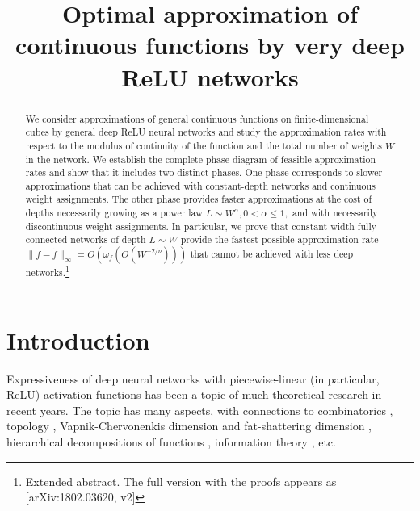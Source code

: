 \documentclass[final, 12pt]{colt2018}
\newcommand{\footremember}[2]{%
    \footnote{#2}
    \newcounter{#1}
    \setcounter{#1}{\value{footnote}}%
}
\begin{document}
\title{Optimal approximation of continuous functions by very deep ReLU networks
}
\maketitle


\begin{abstract} We consider approximations of general continuous functions on finite-dimensional cubes by general deep ReLU neural networks and study the approximation rates with respect to the modulus of continuity of the function and the total number of weights $W$ in the network. We establish the complete phase diagram of feasible approximation rates and show that it includes two distinct phases. One phase corresponds to slower approximations that can be achieved with constant-depth networks and continuous weight assignments. The other phase provides faster approximations at the cost of depths necessarily growing as a power law $L\sim W^{\alpha}, 0<\alpha\le 1,$ and with necessarily discontinuous weight assignments. In particular, we prove that constant-width fully-connected networks of depth $L\sim W$ provide the fastest possible approximation rate $\|f-\widetilde f\|_\infty = O(\omega_f(O(W^{-2/\nu})))$ that cannot be achieved with less deep networks.\footnote{Extended abstract.
The full version with the proofs appears as [arXiv:1802.03620, v2]}  
\end{abstract}

\section{Introduction}
Expressiveness of deep neural networks with piecewise-linear (in particular, ReLU) activation functions has been a topic of much theoretical research in recent years. The topic has many aspects, with connections to combinatorics \citep{montufar2014number,telgarsky2016benefits}, topology \citep{bianchini2014complexity}, Vapnik-Chervonenkis dimension \citep{bartlett1998almost,sakurai1999tight} and fat-shattering dimension \citep{kearns1990efficient,anthony2009neural}, hierarchical decompositions of functions \citep{mhaskar2016learning}, information theory \citep{petersen2017optimal}, etc.
\end{document}
